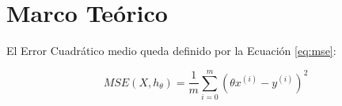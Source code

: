 \section{Marco Teórico}

\blindtext[2]

El Error Cuadrático medio queda definido por la Ecuación \eqref{eq:mse}:

\begin{equation}
	MSE(X,h_\theta)=\frac{1}{m}\sum_{i=0}^m\left(\theta x^{(i)}-y^{(i)} \right)^2 \label{eq:mse}
\end{equation}
